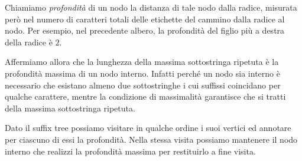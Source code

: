 \begin{enumerate}[(a)]
\begin{figure}[H]
  \end{figure}
  
  Chiamiamo \emph{profondit\`a} di un nodo la distanza di tale nodo dalla 
  radice, misurata per\`o nel numero di caratteri totali delle etichette
  del cammino dalla radice al nodo. Per esempio, nel precedente albero, la 
  profondit\`a del figlio pi\`u a destra della radice \`e \(2\).
  
  Affermiamo allora che la lunghezza della massima sottostringa ripetuta \`e
  la profondit\`a massima di un nodo interno. Infatti perché un nodo sia
  interno \`e necessario che esistano almeno due sottostringhe i cui suffissi
  coincidano per qualche carattere, mentre la condizione di massimalit\`a
  garantisce che si tratti della massima sottostringa ripetuta.
  
  Dato il suffix tree possiamo visitare in qualche ordine i suoi vertici ed
  annotare per ciascuno di essi la profondit\`a. Nella stessa visita possiamo 
  mantenere il nodo interno che realizzi la profondit\`a massima per
  restituirlo a fine visita.
\end{enumerate}
